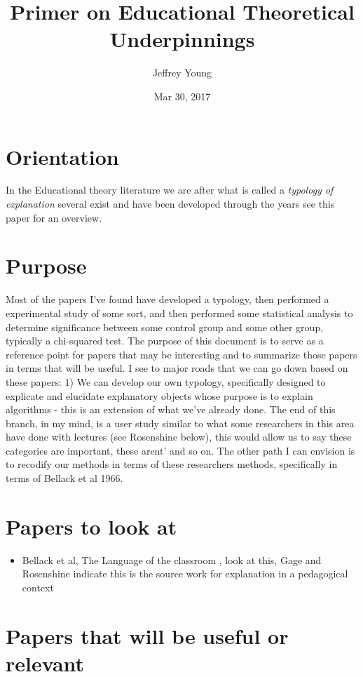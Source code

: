 \documentclass[10pt, letterpaper]{article}
\author{Jeffrey Young}
\date{Mar 30, 2017}
\title{Primer on Educational Theoretical Underpinnings}
\begin{document}
\maketitle


\section*{Orientation}
\label{sec:org8f20302}
In the Educational theory literature we are after what is called a \emph{typology of explanation} several exist and have been developed through the years see this paper \cite{brown1984explaining} for an overview.

\section*{Purpose}
\label{sec:orgc5740c5}
Most of the papers I've found have developed a typology, then performed a experimental study of some sort, and then performed some statistical analysis to determine significance between some control group and some other group, typically a chi-squared test. The purpose of this document is to serve as a reference point for papers that may be interesting and to summarize those papers in terms that will be useful. I see to major roads that we can go down based on these papers: 1) We can develop our own typology, specifically designed to explicate and elucidate explanatory objects whose purpose is to explain algorithms - this is an extension of what we've already done. The end of this branch, in my mind, is a user study similar to what some researchers in this area have done with lectures (see Rosenshine below), this would allow us to say these categories are important, these arent' and so on. The other path I can envision is to recodify our methods in terms of these researchers methods, specifically in terms of Bellack et al 1966.

\section*{Papers to look at}
\label{sec:orga0d09cd}
\begin{itemize}
\item Bellack et al, The Language of the classroom \cite{bellack1966language}, look at this, Gage and Rosenshine indicate this is the source work for explanation in a pedagogical context
\end{itemize}

\section*{Papers that will be useful or relevant}
\label{sec:orgb940c01}
\end{document}
